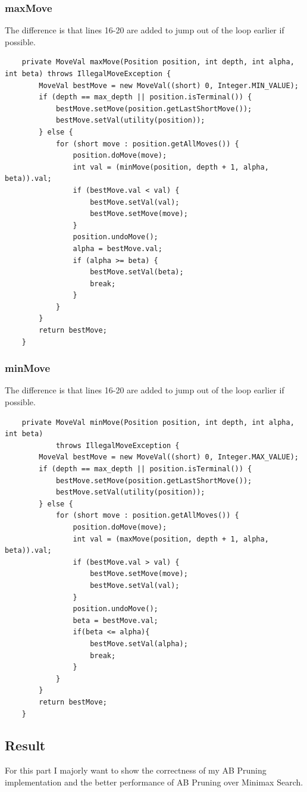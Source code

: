 \documentclass{article}
\begin{document}
\subsubsection{maxMove}
The difference is that lines 16-20 are added to jump out of the loop earlier if possible.
\begin{lstlisting}
	private MoveVal maxMove(Position position, int depth, int alpha, int beta) throws IllegalMoveException {
		MoveVal bestMove = new MoveVal((short) 0, Integer.MIN_VALUE);
		if (depth == max_depth || position.isTerminal()) {
			bestMove.setMove(position.getLastShortMove());
			bestMove.setVal(utility(position));
		} else {
			for (short move : position.getAllMoves()) {
				position.doMove(move);
				int val = (minMove(position, depth + 1, alpha, beta)).val;
				if (bestMove.val < val) {
					bestMove.setVal(val);
					bestMove.setMove(move);
				}
				position.undoMove();
				alpha = bestMove.val;
				if (alpha >= beta) {
					bestMove.setVal(beta);
					break;
				}
			}
		}
		return bestMove;
	}
\end{lstlisting}

\subsubsection{minMove}
The difference is that lines 16-20 are added to jump out of the loop earlier if possible.
\begin{lstlisting}
	private MoveVal minMove(Position position, int depth, int alpha, int beta) 
			throws IllegalMoveException {
		MoveVal bestMove = new MoveVal((short) 0, Integer.MAX_VALUE);
		if (depth == max_depth || position.isTerminal()) {
			bestMove.setMove(position.getLastShortMove());
			bestMove.setVal(utility(position));
		} else {
			for (short move : position.getAllMoves()) {
				position.doMove(move);
				int val = (maxMove(position, depth + 1, alpha, beta)).val;
				if (bestMove.val > val) {
					bestMove.setMove(move);
					bestMove.setVal(val);
				}
				position.undoMove();
				beta = bestMove.val;
				if(beta <= alpha){
					bestMove.setVal(alpha);
					break;
				}
			}
		}
		return bestMove;
	}
\end{lstlisting}

\subsection{Result}
For this part I majorly want to show the correctness of my AB Pruning implementation and the better performance of AB Pruning over Minimax Search.
\end{document}

